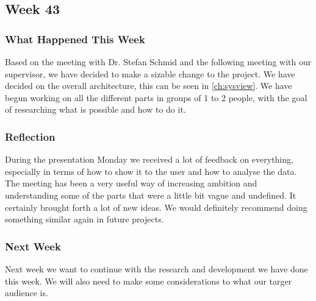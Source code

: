 \subsection{Week 43}\label{Week43}
\subsubsection{What Happened This Week}
Based on the meeting with Dr. Stefan Schmid and the following meeting with our
supervisor, we have decided to make a sizable change to the project. We have
decided on the overall architecture, this can be seen in \autoref{ch:sysview}.
We have begun working on all the different parts in groups of 1 to 2 people,
with the goal of researching what is possible and how to do it.



\subsubsection{Reflection}
During the presentation Monday we received a lot of feedback on everything,
especially in terms of how to show it to the user and how to analyse the data.
The meeting has been a very useful way of increasing ambition and understanding
some of the parts that were a little bit vague and undefined. It certainly
brought forth a lot of new ideas. We would definitely recommend doing something
similar again in future projects.

\subsubsection{Next Week}
Next week we want to continue with the research and development we have done
this week. We will also need to make some considerations to what our targer
audience is.


